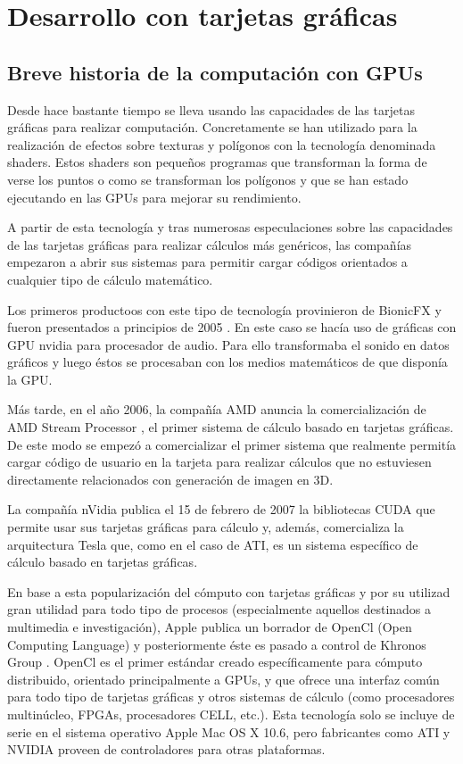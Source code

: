 \chapter{Desarrollo con tarjetas gráficas}

\section{Breve historia de la computación con GPUs}

Desde hace bastante tiempo se lleva usando las capacidades de las tarjetas gráficas para realizar computación. Concretamente se han utilizado para la realización de efectos sobre texturas y polígonos con la tecnología denominada shaders. Estos shaders son pequeños programas que transforman la forma de verse los puntos o como se transforman los polígonos y que se han estado ejecutando en las GPUs para mejorar su rendimiento.

A partir de esta tecnología y tras numerosas especulaciones sobre las capacidades de las tarjetas gráficas para realizar cálculos más genéricos, las compañías empezaron a abrir sus sistemas para permitir cargar códigos orientados a cualquier tipo de cálculo matemático.

Los primeros productoos con este tipo de tecnología provinieron de BionicFX y fueron presentados a principios de 2005 \cite{website:extremetech_gpu_audio}. En este caso se hacía uso de gráficas con GPU nvidia para procesador de audio. Para ello transformaba el sonido en datos gráficos y luego éstos se procesaban con los medios matemáticos de que disponía la GPU.

Más tarde, en el año 2006, la compañía AMD anuncia la comercialización de AMD Stream Processor \cite{website:amd_press_stream}, el primer sistema de cálculo basado en tarjetas gráficas. De este modo se empezó a comercializar el primer sistema que realmente permitía cargar código de usuario en la tarjeta para realizar cálculos que no estuviesen directamente relacionados con generación de imagen en 3D.

La compañía nVidia publica el 15 de febrero de 2007 la bibliotecas CUDA \cite{website:nvidia_press_cuda} que permite usar sus tarjetas gráficas para cálculo y, además, comercializa la arquitectura Tesla que, como en el caso de ATI, es un sistema específico de cálculo basado en tarjetas gráficas.

En base a esta popularización del cómputo con tarjetas gráficas y por  su utilizad gran utilidad para todo tipo de procesos (especialmente aquellos destinados a multimedia e investigación), Apple publica un borrador de OpenCl (Open Computing Language) y posteriormente éste es pasado a control de Khronos Group \cite{website:khronos_press_opencl}. OpenCl es  el primer estándar creado específicamente para cómputo distribuido, orientado principalmente a GPUs, y que ofrece una interfaz común para todo tipo de tarjetas gráficas y otros sistemas de cálculo (como procesadores multinúcleo, FPGAs, procesadores CELL, etc.). Esta tecnología solo se incluye de serie en el sistema operativo Apple Mac OS X 10.6, pero fabricantes como ATI y NVIDIA proveen de controladores para otras plataformas.

